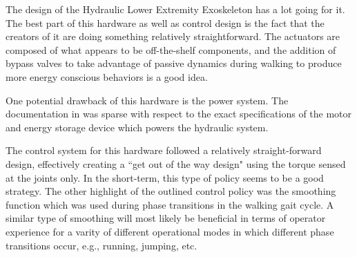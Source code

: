The design of the Hydraulic Lower Extremity Exoskeleton has a lot going for it.  The best part of this hardware as well as control design is the fact that the creators of it are doing something relatively straightforward.  The actuators are composed of what appears to be off-the-shelf components, and the addition of bypass valves to take advantage of passive dynamics during walking to produce more energy conscious behaviors is a good idea.    

One potential drawback of this hardware is the power system.  The documentation in \cite{} was sparse with respect to the exact specifications of the motor and energy storage device which powers the hydraulic system.

The control system for this hardware followed a relatively straight-forward design, effectively creating a ``get out of the way design" using the torque sensed at the joints only.  In the short-term, this type of policy seems to be a good strategy.  The other highlight of the outlined control policy was the smoothing function which was used during phase transitions in the walking gait cycle.  A similar type of smoothing will most likely be beneficial in terms of operator experience for a varity of different operational modes in which different phase transitions occur, e.g., running, jumping, etc.
 
 

 
 
 
 